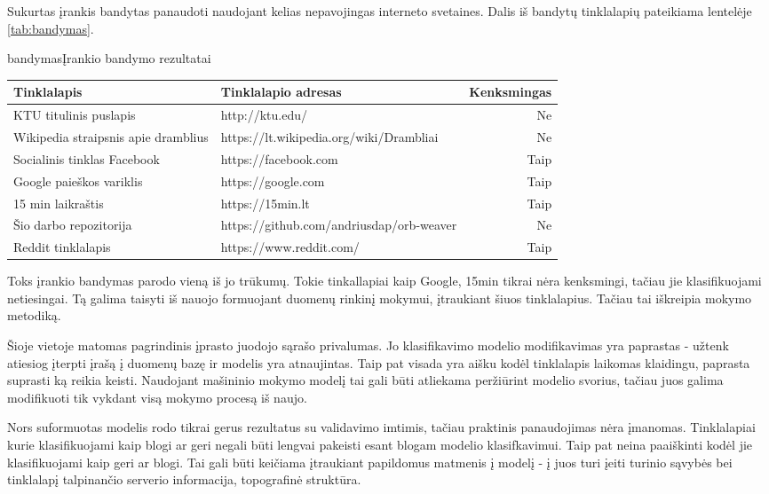 
Sukurtas įrankis bandytas panaudoti naudojant kelias nepavojingas interneto svetaines. Dalis iš bandytų
tinklalapių pateikiama lentelėje \vref{tab:bandymas}.

\begin{ktutable}{bandymas}{Įrankio bandymo rezultatai}
    \begin{tabular}{|p{5 cm}|p{5 cm}|r|}
    \hline
    Tinklalapis & Tinklalapio adresas & Kenksmingas \\ \hline
    KTU titulinis puslapis & http://ktu.edu/ & Ne \\ \hline
    Wikipedia straipsnis apie dramblius & https://lt.wikipedia.org/wiki/Drambliai & Ne \\ \hline
    Socialinis tinklas Facebook & https://facebook.com & Taip \\ \hline
    Google paieškos variklis & https://google.com & Taip \\ \hline
    15 min laikraštis & https://15min.lt & Taip \\ \hline
    Šio darbo repozitorija & https://github.com/andriusdap/orb-weaver & Ne \\ \hline
    Reddit tinklalapis & https://www.reddit.com/ & Taip \\ \hline
    \end{tabular}
\end{ktutable}

Toks įrankio bandymas parodo vieną iš jo trūkumų. Tokie tinkallapiai kaip Google, 15min tikrai nėra kenksmingi,
tačiau jie klasifikuojami netiesingai. Tą galima taisyti iš nauojo formuojant duomenų rinkinį mokymui,
įtraukiant šiuos tinklalapius. Tačiau tai iškreipia mokymo metodiką.

Šioje vietoje matomas pagrindinis įprasto juodojo sąrašo privalumas. Jo klasifikavimo modelio modifikavimas yra
paprastas - užtenk atiesiog įterpti įrašą į duomenų bazę ir modelis yra atnaujintas. Taip pat visada yra aišku
kodėl tinklalapis laikomas klaidingu, paprasta suprasti ką reikia keisti. Naudojant mašininio mokymo modelį tai
gali būti atliekama peržiūrint modelio svorius, tačiau juos galima modifikuoti tik vykdant visą mokymo procesą iš naujo.

Nors suformuotas modelis rodo tikrai gerus rezultatus su validavimo imtimis, tačiau praktinis panaudojimas nėra
įmanomas. Tinklalapiai kurie klasifikuojami kaip blogi ar geri negali būti lengvai pakeisti esant blogam modelio
klasifkavimui. Taip pat neina paaiškinti kodėl jie klasifikuojami kaip geri ar blogi. Tai gali būti keičiama
įtraukiant papildomus matmenis į modelį - į juos turi įeiti turinio sąvybės bei tinklalapį talpinančio serverio
informacija, topografinė struktūra.